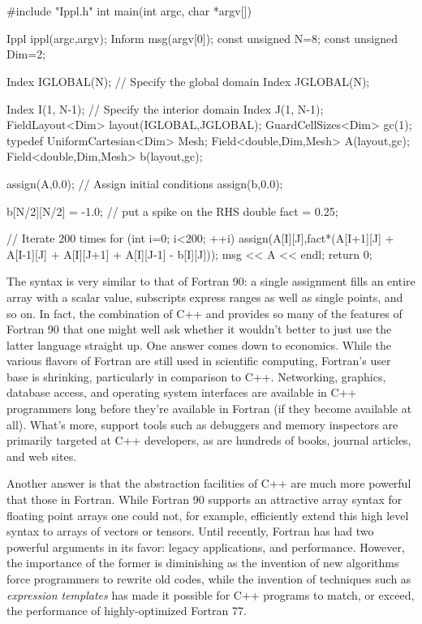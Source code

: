 \section{}
\begin{code}[caption={Laplace solver}]
#include "Ippl.h"
int main(int argc, char *argv[])
{
    Ippl ippl(argc,argv);
    Inform msg(argv[0]);
    const unsigned N=8;
    const unsigned Dim=2;

    Index IGLOBAL(N);  // Specify the global domain
    Index JGLOBAL(N);

    Index I(1, N-1); // Specify the interior domain
    Index J(1, N-1);
    FieldLayout<Dim> layout(IGLOBAL,JGLOBAL);
    GuardCellSizes<Dim> gc(1);
    typedef UniformCartesian<Dim> Mesh;
    Field<double,Dim,Mesh> A(layout,gc);
    Field<double,Dim,Mesh> b(layout,gc);

    assign(A,0.0);  // Assign initial conditions
    assign(b,0.0);

    b[N/2][N/2] = -1.0;  // put a spike on the RHS
    double fact = 0.25;

    // Iterate 200 times
    for (int i=0; i<200; ++i) {
        assign(A[I][J],fact*(A[I+1][J] +
                             A[I-1][J] +
                             A[I][J+1] +
                             A[I][J-1] - b[I][J]));
    }
    msg << A << endl;
    return 0;
}
\end{code}
The syntax is very similar to that of Fortran 90: a single assignment fills an entire array with a scalar value, subscripts express ranges as well as single points, and so on. In fact, the combination of C++ and \ippl provides so many of the features of Fortran 90 that one might well ask whether it wouldn't better to just use the latter language straight up. One answer comes down to economics. While the various flavors of Fortran are still used in scientific computing, Fortran's user base is shrinking, particularly in comparison to C++. Networking, graphics, database access, and operating system interfaces are available in C++ programmers long before they're available in Fortran (if they become available at all). What's more, support tools such as debuggers and memory inspectors are primarily targeted at C++ developers, as are hundreds of books, journal articles, and web sites.

Another answer is that the abstraction facilities of C++ are much more powerful that those in Fortran. While Fortran 90 supports an attractive array syntax for floating point arrays one could not, for example, efficiently extend this high level syntax to arrays of vectors or tensors. Until recently, Fortran has had two powerful arguments in its favor: legacy applications, and performance. However, the importance of the former is diminishing as the invention of new algorithms force programmers to rewrite old codes, while the invention of techniques such as {\it expression templates} has made it possible for C++ programs to match, or exceed, the performance of highly-optimized Fortran 77.

